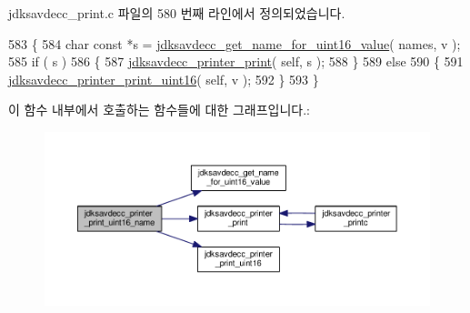 jdksavdecc\+\_\+print.\+c 파일의 580 번째 라인에서 정의되었습니다.


\begin{DoxyCode}
583 \{
584     \textcolor{keywordtype}{char} \textcolor{keyword}{const} *s = \hyperlink{group__util_ga57128fd5b5fe236fb5158d51cef2bf96}{jdksavdecc\_get\_name\_for\_uint16\_value}( names, v );
585     \textcolor{keywordflow}{if} ( s )
586     \{
587         \hyperlink{group__util_ga335ac75e0aa3fe66501b752bf9d0f90d}{jdksavdecc\_printer\_print}( \textcolor{keyword}{self}, s );
588     \}
589     \textcolor{keywordflow}{else}
590     \{
591         \hyperlink{group__util_ga9793e0ff8e7ed25d957282ee6b257ce2}{jdksavdecc\_printer\_print\_uint16}( \textcolor{keyword}{self}, v );
592     \}
593 \}
\end{DoxyCode}


이 함수 내부에서 호출하는 함수들에 대한 그래프입니다.\+:
\nopagebreak
\begin{figure}[H]
\begin{center}
\leavevmode
\includegraphics[width=350pt]{group__util_ga62486d864a66773d19bbbe23cebf346a_cgraph}
\end{center}
\end{figure}





